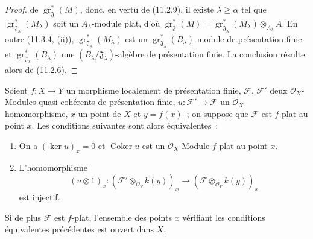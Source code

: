 \begin{proof}
de $\operatorname{gr}_{\mathfrak J}^*(M)$, donc, en vertu de (11.2.9), il
existe $\lambda\geq\alpha$ tel que
$\operatorname{gr}_{\mathfrak J_\lambda}^*(M_\lambda)$ soit un
$A_\lambda$-module plat, d'où
$\operatorname{gr}_{\mathfrak J}^*(M)
=\operatorname{gr}_{\mathfrak J_\lambda}^*(M_\lambda)\otimes_{A_\lambda}A$.
En outre (11.3.4, (ii)),
$\operatorname{gr}_{\mathfrak J_\lambda}^*(M_\lambda)$ est un
$\operatorname{gr}_{\mathfrak J_\lambda}^*(B_\lambda)$-module de présentation
finie et $\operatorname{gr}_{\mathfrak J_\lambda}^*(B_\lambda)$ une
$(B_\lambda/\mathfrak J_\lambda)$-algèbre de présentation finie. La conclusion
résulte alors de (11.2.6).
\end{proof}


\begin{proposition}[11.3.7]
\label{IV.11.3.7-fr}
Soient $f:X\to Y$ un morphisme localement de présentation finie,
$\mathcal F$, $\mathcal F'$ deux $\mathcal O_X$-Modules quasi-cohérents de
présentation finie, $u:\mathcal F'\to\mathcal F$ un
$\mathcal O_X$-homomorphisme, $x$ un point de $X$ et $y=f(x)$~; on suppose que
$\mathcal F$ est $f$-plat au point $x$. Les conditions suivantes sont alors
équivalentes~:
\begin{enumerate}[label=\emph{\alph*)}]
\item On a $(\ker u)_x=0$ et $\operatorname{Coker}u$ est un
$\mathcal O_X$-Module $f$-plat au point $x$.
\item L'homomorphisme
\[
(u\otimes1)_x:(\mathcal F'\otimes_{\mathcal O_Y}k(y))_x
\longrightarrow(\mathcal F\otimes_{\mathcal O_Y}k(y))_x
\]
est injectif.
\end{enumerate}
Si de plus $\mathcal F$ est $f$-plat, l'ensemble des points $x$ vérifiant les
conditions équivalentes précédentes est ouvert dans $X$.
\end{proposition}


